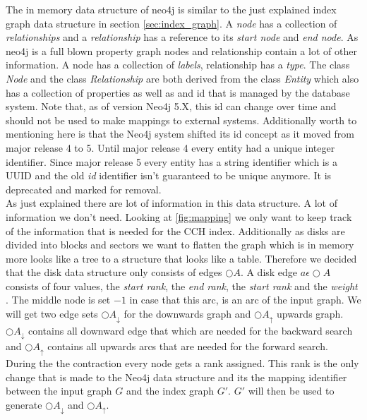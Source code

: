 The in memory data structure of neo4j is similar to the just explained index graph data structure in section \ref{sec:index_graph}. A \textit{node} has a collection of \textit{relationships} and a \textit{relationship} has a reference to its \textit{start node} and \textit{end node}.
As neo4j is a full blown property graph nodes and relationship contain a lot of other information. A node has a collection of \textit{labels}, relationship has a \textit{type}. The class \textit{Node} and the class \textit{Relationship} 
are both derived from the class \textit{Entity} which also has a collection of properties as well as and id that is managed by the database system. Note that, as of version Neo4j 5.X, this id can change over time and should not be used to make mappings to external systems. Additionally 
worth to mentioning here is that the Neo4j system shifted its id concept as it moved from major release 4 to 5. Until major release 4 every entity had a unique integer identifier. Since major release 5 every entity has a string identifier which is a UUID and the old \textit{id} identifier
isn't guaranteed to be unique anymore. It is deprecated and marked for removal.
\\
As just explained there are lot of information in this data structure. A lot of information we don't need. Looking at \ref{fig:mapping} we only want to keep track of the information that is needed for the CCH index. Additionally as disks are
divided  into blocks and sectors we want to flatten the graph which is in memory more looks like a tree to a structure that looks like a table. Therefore we decided that the disk data structure only consists of edges $\bigcirc A$. A disk edge $a \epsilon \bigcirc A$ consists of four values, 
the \textit{start rank}, the \textit{end rank}, the \textit{start rank} and the \textit{weight} . The middle node is set $-1$ in case that this arc, is an arc of the input graph. We will get two edge sets $\bigcirc A_\downarrow$ for the downwards graph and $\bigcirc A_\uparrow $ upwards graph.
$\bigcirc A_\downarrow$ contains all downward edge that which are needed for the backward search and $\bigcirc A_\uparrow$ contains all upwards arcs that are needed for the forward search.
\\
During the the contraction every node gets a rank assigned. This rank is the only change that is made to the Neo4j data structure and its the mapping identifier between the input graph $G$ and the index graph $G'$. $G'$ will then be used to generate $\bigcirc A_\downarrow$ and $\bigcirc A_\uparrow$.


